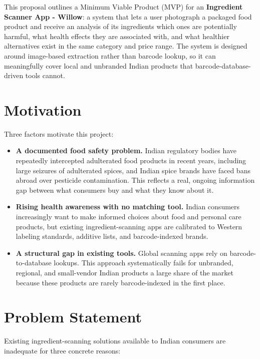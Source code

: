 \documentclass[11pt,a4paper]{article}
\begin{document}
This proposal outlines a Minimum Viable Product (MVP) for an \textbf{Ingredient Scanner App - Willow}: a system that lets a user photograph a packaged food product and receive an analysis of its ingredients which ones are potentially harmful, what health effects they are associated with, and what healthier alternatives exist in the same category and price range. The system is designed around image-based extraction rather than barcode lookup, so it can meaningfully cover local and unbranded Indian products that barcode-database-driven tools cannot.

\section{Motivation}
Three factors motivate this project:

\begin{itemize}
  \item \textbf{A documented food safety problem.} Indian regulatory bodies have repeatedly intercepted adulterated food products in recent years, including large seizures of adulterated spices, and Indian spice brands have faced bans abroad over pesticide contamination. This reflects a real, ongoing information gap between what consumers buy and what they know about it.
  \item \textbf{Rising health awareness with no matching tool.} Indian consumers increasingly want to make informed choices about food and personal care products, but existing ingredient-scanning apps are calibrated to Western labeling standards, additive lists, and barcode-indexed brands.
  \item \textbf{A structural gap in existing tools.} Global scanning apps rely on barcode-to-database lookups. This approach systematically fails for unbranded, regional, and small-vendor Indian products a large share of the market because these products are rarely barcode-indexed in the first place.
\end{itemize}

\section{Problem Statement}
Existing ingredient-scanning solutions available to Indian consumers are inadequate for three concrete reasons:
\end{document}
